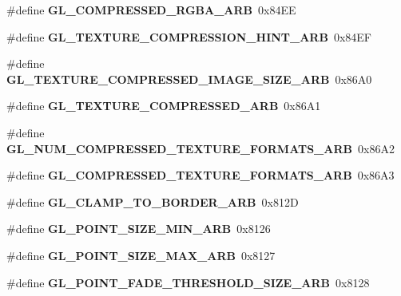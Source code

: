 \begin{DoxyCompactItemize}
\item 
\#define {\bfseries G\+L\+\_\+\+C\+O\+M\+P\+R\+E\+S\+S\+E\+D\+\_\+\+R\+G\+B\+A\+\_\+\+A\+R\+B}~0x84\+E\+E\label{_s_d_l__opengl_8h_aae4672d854ed9febf82945f9fea7f393}

\item 
\#define {\bfseries G\+L\+\_\+\+T\+E\+X\+T\+U\+R\+E\+\_\+\+C\+O\+M\+P\+R\+E\+S\+S\+I\+O\+N\+\_\+\+H\+I\+N\+T\+\_\+\+A\+R\+B}~0x84\+E\+F\label{_s_d_l__opengl_8h_ae2e92ecb1bf69bad3e1f9791ebc10071}

\item 
\#define {\bfseries G\+L\+\_\+\+T\+E\+X\+T\+U\+R\+E\+\_\+\+C\+O\+M\+P\+R\+E\+S\+S\+E\+D\+\_\+\+I\+M\+A\+G\+E\+\_\+\+S\+I\+Z\+E\+\_\+\+A\+R\+B}~0x86\+A0\label{_s_d_l__opengl_8h_a4d3adca17ec71753a1f47338258a6442}

\item 
\#define {\bfseries G\+L\+\_\+\+T\+E\+X\+T\+U\+R\+E\+\_\+\+C\+O\+M\+P\+R\+E\+S\+S\+E\+D\+\_\+\+A\+R\+B}~0x86\+A1\label{_s_d_l__opengl_8h_a016a33500d8145b8b325cc28a4cd98df}

\item 
\#define {\bfseries G\+L\+\_\+\+N\+U\+M\+\_\+\+C\+O\+M\+P\+R\+E\+S\+S\+E\+D\+\_\+\+T\+E\+X\+T\+U\+R\+E\+\_\+\+F\+O\+R\+M\+A\+T\+S\+\_\+\+A\+R\+B}~0x86\+A2\label{_s_d_l__opengl_8h_afea861fd6a3db5b4956cd15bc86c832d}

\item 
\#define {\bfseries G\+L\+\_\+\+C\+O\+M\+P\+R\+E\+S\+S\+E\+D\+\_\+\+T\+E\+X\+T\+U\+R\+E\+\_\+\+F\+O\+R\+M\+A\+T\+S\+\_\+\+A\+R\+B}~0x86\+A3\label{_s_d_l__opengl_8h_a627e0a3efa826d10a7d46d0b4d6a9098}

\item 
\#define {\bfseries G\+L\+\_\+\+C\+L\+A\+M\+P\+\_\+\+T\+O\+\_\+\+B\+O\+R\+D\+E\+R\+\_\+\+A\+R\+B}~0x812\+D\label{_s_d_l__opengl_8h_a4e575170092853f85624ce37e614e207}

\item 
\#define {\bfseries G\+L\+\_\+\+P\+O\+I\+N\+T\+\_\+\+S\+I\+Z\+E\+\_\+\+M\+I\+N\+\_\+\+A\+R\+B}~0x8126\label{_s_d_l__opengl_8h_a3dffec2a58d27eeda9baca31088940b0}

\item 
\#define {\bfseries G\+L\+\_\+\+P\+O\+I\+N\+T\+\_\+\+S\+I\+Z\+E\+\_\+\+M\+A\+X\+\_\+\+A\+R\+B}~0x8127\label{_s_d_l__opengl_8h_a015ae9d32c5b744a62492459147efe83}

\item 
\#define {\bfseries G\+L\+\_\+\+P\+O\+I\+N\+T\+\_\+\+F\+A\+D\+E\+\_\+\+T\+H\+R\+E\+S\+H\+O\+L\+D\+\_\+\+S\+I\+Z\+E\+\_\+\+A\+R\+B}~0x8128\label{_s_d_l__opengl_8h_adf9966c52f3900df31a76bd615db351d}


\end{DoxyCompactItemize}
